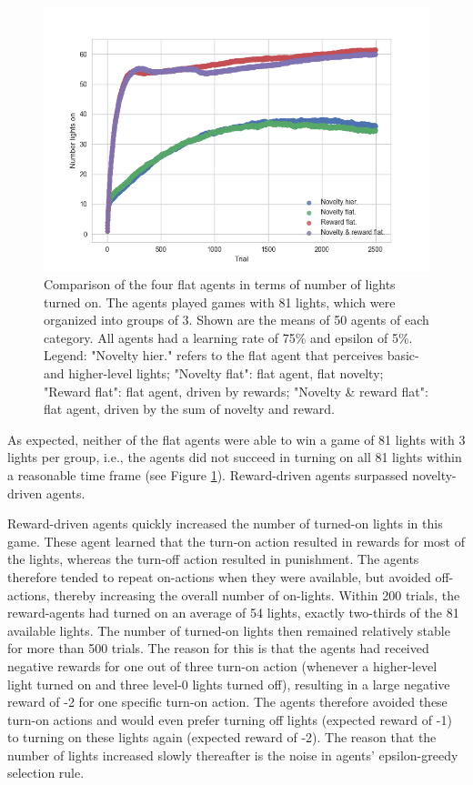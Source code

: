 \documentclass{article}
\begin{document}
\begin{figure}[h]
  \centering
  \includegraphics[width=\linewidth]{NIPSfigures/NLights.png}
  \caption{Comparison of the four flat agents in terms of number of lights turned on. The agents played games with 81 lights, which were organized into groups of 3. Shown are the means of 50 agents of each category. All agents had a learning rate of 75\% and epsilon of 5\%. Legend: "Novelty hier." refers to the flat agent that perceives basic- and higher-level lights; "Novelty flat": flat agent, flat novelty; "Reward flat": flat agent, driven by rewards; "Novelty \& reward flat": flat agent, driven by the sum of novelty and reward.}
  \label{ResultsFlatFigure}
\end{figure}

As expected, neither of the flat agents were able to win a game of 81 lights with 3 lights per group, i.e., the agents did not succeed in turning on all 81 lights within a reasonable time frame (see Figure \ref{ResultsFlatFigure}). Reward-driven agents surpassed novelty-driven agents. 

Reward-driven agents quickly increased the number of turned-on lights in this game. These agent learned that the turn-on action resulted in rewards for most of the lights, whereas the turn-off action resulted in punishment. The agents therefore tended to repeat on-actions when they were available, but avoided off-actions, thereby increasing the overall number of on-lights. Within 200 trials, the reward-agents had turned on an average of 54 lights, exactly two-thirds of the 81 available lights. The number of turned-on lights then remained relatively stable for more than 500 trials. The reason for this is that the agents had received negative rewards for one out of three turn-on action (whenever a higher-level light turned on and three level-0 lights turned off), resulting in a large negative reward of -2 for one specific turn-on action. The agents therefore avoided these turn-on actions and would even prefer turning off lights (expected reward of -1) to turning on these lights again (expected reward of -2). The reason that the number of lights increased slowly thereafter is the noise in agents' epsilon-greedy selection rule. 
\end{document}
